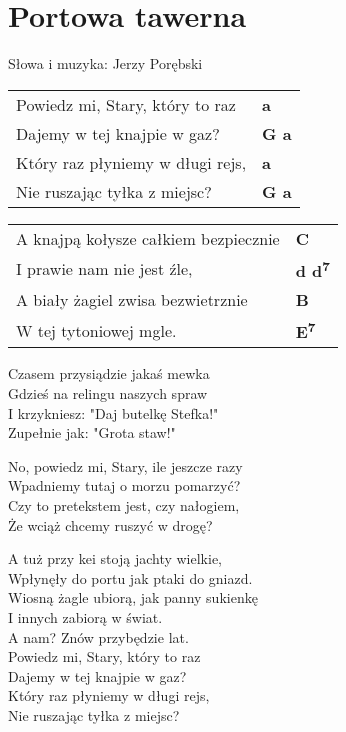 \section{Portowa tawerna}

Słowa i muzyka: Jerzy Porębski

\vspace{2em}
\begin{tabular}{@{}p{6cm}@{}l@{}}
Powiedz mi, Stary, który to raz & \bfseries a\\
Dajemy w tej knajpie w gaz? & \bfseries G a\\
Który raz płyniemy w długi rejs, & \bfseries a\\
Nie ruszając tyłka z miejsc? & \bfseries G a\\
\end{tabular}

\vspace{1em}
\begin{tabular}{@{}p{6cm}@{}l@{}}
A knajpą kołysze całkiem bezpiecznie & \bfseries C\\
I prawie nam nie jest źle, & \bfseries d d\textsuperscript{7}\\
A biały żagiel zwisa bezwietrznie & \bfseries B\\
W tej tytoniowej mgle. & \bfseries E\textsuperscript{7}\\
\end{tabular}

\vspace{1em}
Czasem przysiądzie jakaś mewka \\
Gdzieś na relingu naszych spraw \\
I krzykniesz: "Daj butelkę Stefka!" \\
Zupełnie jak: "Grota staw!" \\

\begin{multicols}{2}
No, powiedz mi, Stary, ile jeszcze razy \\
Wpadniemy tutaj o morzu pomarzyć? \\
Czy to pretekstem jest, czy nałogiem, \\
Że wciąż chcemy ruszyć w drogę? \\
\newcolumn

A tuż przy kei stoją jachty wielkie, \\
Wpłynęły do portu jak ptaki do gniazd. \\
Wiosną żagle ubiorą, jak panny sukienkę \\
I innych zabiorą w świat. \\
A nam? Znów przybędzie lat. \\

Powiedz mi, Stary, który to raz \\
Dajemy w tej knajpie w gaz? \\
Który raz płyniemy w długi rejs, \\
Nie ruszając tyłka z miejsc?
\end{multicols}